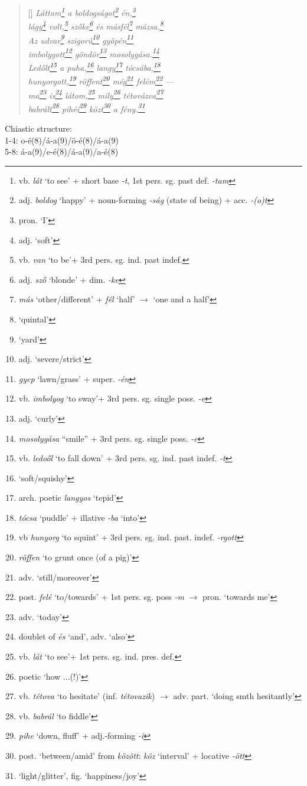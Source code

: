 \documentclass[a4paper,12pt,twoside,final]{book}
\begin{document}
\begin{verse}[\versewidth]
  \it
  Láttam\footnote{vb. \emph{lát} `to see' +
  short base \emph{-t}, 1st pers. sg. past def. \emph{-tam}} a
  boldogságot\footnote{adj. \emph{boldog} `happy' + noun-forming
  \emph{-ság} (state of being) + acc. \emph{-(o)t}}
  én,\footnote{pron. `I'} \\
  lágy\footnote{adj. `soft'} volt,\footnote{vb. \emph{van} `to
  be'+ 3rd pers. sg. ind. past indef.} szőke\footnote{adj. \emph{sző}
  `blonde' + dim. \emph{-ke}} és másfél\footnote{\emph{más}
  `other/different' + \emph{fél} `half' $\rightarrow$ `one and a
  half'} mázsa.\footnote{`quintal'} \\
  Az udvar\footnote{`yard'} szigorú\footnote{adj. `severe/strict'}
  gyöpén\footnote{\emph{gyep} `lawn/grass' + super. \emph{-én}}  \\
  imbolygott\footnote{vb. \emph{imbolyog} `to sway'+ 3rd
  pers. sg. single poss. \emph{-e}} göndör\footnote{adj. `curly'}
  mosolygása.\footnote{\emph{mosolygása} ``smile'' + 3rd
  pers. sg. single poss. \emph{-e}} \\
  Ledőlt\footnote{vb. \emph{ledoől} `to fall down' + 3rd
  pers. sg. ind. past indef. \emph{-t}} a puha,\footnote{`soft/squishy'}
  langy\footnote{arch. poetic \emph{langyos} `tepid'}
  tócsába,\footnote{\emph{tócsa} `puddle' + illative \emph{-ba}
  `into'} \\
  hunyorgott,\footnote{vb \emph{hunyorg} `to squint' + 3rd
  pers. sg. ind. past. indef. \emph{-rgott}}
  röffent\footnote{\emph{röffen} `to grunt once (of a pig)'}
  még\footnote{adv. `still/moreover'} felém\footnote{post. \emph{felé}
  `to/towards' + 1st pers. sg. poss \emph{-m} $\rightarrow$
  pron. `towards me'} --- \\
  ma\footnote{adv. `today'} is\footnote{doublet of \emph{és} `and',
  adv. `also'} látom,\footnote{vb. \emph{lát} `to see'+ 1st
  pers. sg. ind. pres. def.} mily\footnote{poetic `how ...(!)'}
  tétovázva\footnote{vb. \emph{tétova} `to hesitate'
  (inf. \emph{tétovazik}) $\rightarrow$ adv. part. `doing smth
  hesitantly'} \\
  babrált\footnote{vb. \emph{babrál} `to fiddle'}
  pihéi\footnote{\emph{pihe} `down, fluff' + adj.-forming \emph{-i}}
  közt\footnote{post. `between/amid' from \emph{között}: \emph{köz}
  `interval' + locative \emph{-ött}} a fény.\footnote{`light/glitter',
  fig. `happiness/joy'} \\
\end{verse}

\noindent Chiastic structure: \\
1-4: o-é(8)/á-a(9)/ö-é(8)/á-a(9) \\
5-8: á-a(9)/e-é(8)/á-a(9)/a-é(8)
\end{document}
